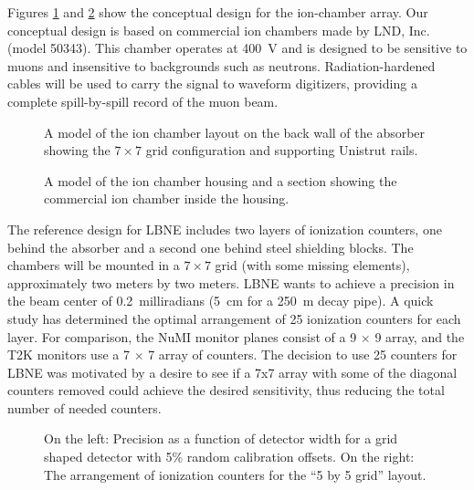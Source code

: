 Figures \ref{fig:IonChamberLayout} and \ref{fig:IonChamberHousing}
show the conceptual design for the ion-chamber array. Our conceptual
design is based on commercial ion chambers made by LND, Inc. (model 50343). 
This chamber operates at 400~V and is designed to be sensitive to muons and insensitive to 
backgrounds such as neutrons. 
Radiation-hardened cables will be used to carry the signal to waveform
digitizers, providing a complete spill-by-spill record of the
muon beam.

\begin{figure}[htbp]
\begin{center}
\caption[Model of ion chamber layout]
{A model of the ion chamber layout on the back wall of the absorber
showing the $7\times 7$ grid configuration and supporting Unistrut rails.}
\label{fig:IonChamberLayout}
\end{center}
\end{figure}


\begin{figure}[htbp]
\begin{center}
\centering
\caption[Model of ion chamber housing]
{A model of the ion chamber housing and a section showing the commercial ion chamber inside the housing.}
\label{fig:IonChamberHousing}
\end{center}
\end{figure}


The reference design for LBNE includes two layers of ionization counters, one 
behind the absorber and a second one behind steel shielding blocks. The chambers
will be mounted in a $7 \times 7$ grid (with some missing elements), approximately two meters by two meters. 
LBNE wants to achieve a precision in the beam center of 0.2~milliradians
(5~cm for a 250~m decay pipe). A quick study has 
determined the optimal arrangement of 25 ionization counters for each layer. 
For comparison, the NuMI monitor planes consist of a 
9 $\times$ 9 array, and the T2K monitors use a 7 $\times$ 7 array of counters. 
The decision to use 25 counters for LBNE was motivated by a desire to see if a 7x7 array with some of the diagonal counters removed could achieve the desired sensitivity, thus reducing the total number of needed counters.

\begin{figure}[htb]
\centering
\caption[Ion chamber performance for grid layout]
{On the left: Precision as a function of detector width for a grid 
shaped detector with 5\% random calibration offsets. On the right: The 
arrangement of ionization counters for the ``5 by 5 grid'' layout.}
\label{fig:ion_grid}
\end{figure}

